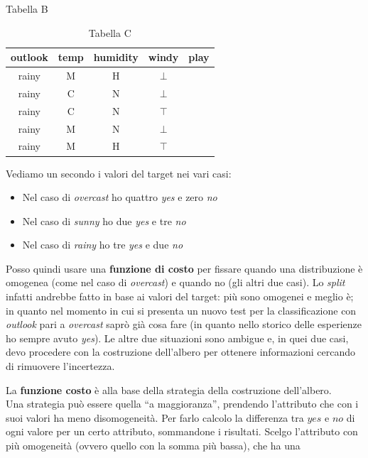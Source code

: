 \begin{esempio}
\begin{table}[H]
    \caption{Tabella B}
  \end{table}
  \begin{table}[H]
    \centering
    \begin{tabular}{c|c|c|c|c}
      outlook & temp & humidity & windy & play\\
      \hline
      rainy & M & H & $\bot$ & \color{darkgreen}{yes}\\
      rainy & C & N & $\bot$ & \color{darkgreen}{yes}\\
      rainy & C & N & $\top$ & \color{red}{no}\\
      rainy & M & N & $\bot$ & \color{darkgreen}{yes}\\
      rainy & M & H & $\top$ & \color{red}{no}
    \end{tabular}
    \caption{Tabella C}
  \end{table}
 
  Vediamo un secondo i valori del target nei vari casi:
  \begin{itemize}
    \item Nel caso di \textit{overcast} ho quattro \textit{yes} e zero \textit{no}
    \item Nel caso di \textit{sunny} ho due \textit{yes} e tre \textit{no}
    \item Nel caso di \textit{rainy} ho tre \textit{yes} e due \textit{no}
  \end{itemize}
  Posso quindi usare una \textbf{funzione di costo} per fissare quando una
  distribuzione è omogenea (come nel caso di \textit{overcast}) e quando no (gli
  altri due casi). Lo \textit{split} infatti andrebbe fatto in base ai valori
  del target: più sono omogenei e meglio è; in quanto nel momento in cui si
  presenta un nuovo test per la classificazione con \textit{outlook} pari a
  \textit{overcast} saprò già cosa fare (in quanto nello storico delle
  esperienze ho sempre avuto \textit{yes}). Le altre due situazioni sono
  ambigue e, in quei due casi, devo procedere con la costruzione
  dell'albero per ottenere informazioni cercando di rimuovere l'incertezza.  
\end{esempio}
La \textbf{funzione costo} è alla base della strategia della costruzione
dell'albero.\\
Una strategia può essere quella ``a maggioranza'', prendendo l'attributo che con
i suoi valori ha meno disomogeneità. Per farlo calcolo la differenza tra $yes$ e
$no$ di ogni valore per un certo attributo, sommandone i risultati. Scelgo
l'attributo con più omogeneità (ovvero quello con la somma più bassa), che ha una
